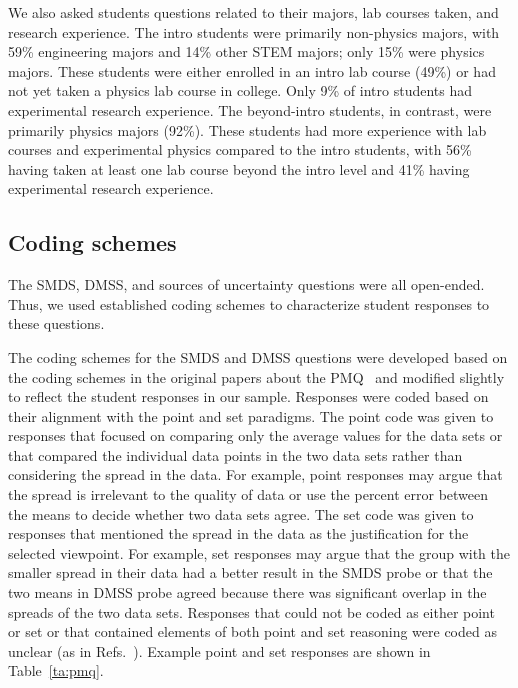 \documentclass[english,aps,prstper,reprint,showpacs,longbibliography,superscriptaddress,nofootinbib]{revtex4-2}
\begin{document}
We also asked students questions related to their majors, lab courses taken, and research experience. The intro students were primarily non-physics majors, with 59\% engineering majors and 14\% other STEM majors; only 15\% were physics majors. These students were either enrolled in an intro lab course (49\%) or had not yet taken a physics lab course in college. Only 9\% of intro students had experimental research experience. The beyond-intro students, in contrast, were primarily physics majors (92\%). These students had more experience with lab courses and experimental physics compared to the intro students, with 56\% having taken at least one lab course beyond the intro level and 41\% having experimental research experience.

\subsection{Coding schemes}

The SMDS, DMSS, and sources of uncertainty questions were all open-ended. Thus, we used established coding schemes to characterize student responses to these questions.

The coding schemes for the SMDS and DMSS questions were developed based on the coding schemes in the original papers about the PMQ~\cite{Allie1998,Buffler2001,Lubben2001} and modified slightly to reflect the student responses in our sample. Responses were coded based on their alignment with the point and set paradigms. The point code was given to responses that focused on comparing only the average values for the data sets or that compared the individual data points in the two data sets rather than considering the spread in the data. For example, point responses may argue that the spread is irrelevant to the quality of data or use the percent error between the means to decide whether two data sets agree. The set code was given to responses that mentioned the spread in the data as the justification for the selected viewpoint. For example, set responses may argue that the group with the smaller spread in their data had a better result in the SMDS probe or that the two means in DMSS probe agreed because there was significant overlap in the spreads of the two data sets. Responses that could not be coded as either point or set or that contained elements of both point and set reasoning were coded as unclear (as in Refs.~\cite{Allie1998, Buffler2001, Lubben2001}). Example point and set responses are shown in Table~\ref{ta:pmq}.
\end{document}
